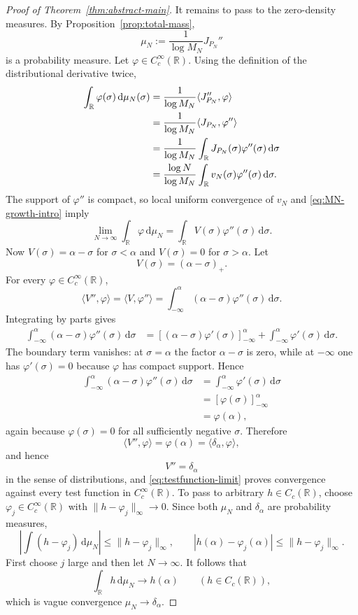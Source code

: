 \documentclass[11pt]{article}
\theoremstyle{definition}
\newcommand{\R}{\mathbb R}
\newcommand{\dd}{\,\mathrm d}
\newcommand{\1}{\mathbf 1}
\begin{document}
\begin{proof}[Proof of Theorem~\ref{thm:abstract-main}]
It remains to pass to the zero-density measures.  By Proposition~\ref{prop:total-mass},
\[
\mu_N:=\frac{1}{\log M_N}J_{P_N}''
\]
is a probability measure.  Let $\varphi\in C_c^\infty(\R)$.  Using the definition of the distributional derivative twice,
\begin{align}
\int_\R\varphi(\sigma)\dd\mu_N(\sigma)
&=\frac1{\log M_N}\langle J_{P_N}'',\varphi\rangle\notag\\
&=\frac1{\log M_N}\langle J_{P_N},\varphi''\rangle\notag\\
&=\frac1{\log M_N}
\int_\R J_{P_N}(\sigma)\varphi''(\sigma)\dd\sigma\notag\\
&=\frac{\log N}{\log M_N}
\int_\R v_N(\sigma)\varphi''(\sigma)\dd\sigma.
\label{eq:testfunction-measure}
\end{align}
The support of $\varphi''$ is compact, so local uniform convergence of $v_N$ and \eqref{eq:MN-growth-intro} imply
\begin{equation}\label{eq:testfunction-limit}
\lim_{N\to\infty}\int_\R\varphi\dd\mu_N
=\int_\R V(\sigma)\varphi''(\sigma)\dd\sigma.
\end{equation}
Now $V(\sigma)=\alpha-\sigma$ for $\sigma<\alpha$ and $V(\sigma)=0$ for $\sigma>\alpha$.  Let
\[
V(\sigma)=(\alpha-\sigma)_+.
\]
For every $\varphi\in C_c^\infty(\R)$,
\[
\langle V'',\varphi\rangle
=
\langle V,\varphi''\rangle
=
\int_{-\infty}^{\alpha}
(\alpha-\sigma)\varphi''(\sigma)\dd\sigma.
\]
Integrating by parts gives
\begin{align*}
\int_{-\infty}^{\alpha}
(\alpha-\sigma)\varphi''(\sigma)\dd\sigma
&=
\left[
(\alpha-\sigma)\varphi'(\sigma)
\right]_{-\infty}^{\alpha}
+
\int_{-\infty}^{\alpha}\varphi'(\sigma)\dd\sigma.
\end{align*}
The boundary term vanishes: at $\sigma=\alpha$ the factor
$\alpha-\sigma$ is zero, while at $-\infty$ one has
$\varphi'(\sigma)=0$ because $\varphi$ has compact support.  Hence
\begin{align*}
\int_{-\infty}^{\alpha}
(\alpha-\sigma)\varphi''(\sigma)\dd\sigma
&=
\int_{-\infty}^{\alpha}\varphi'(\sigma)\dd\sigma\\
&=
\left[\varphi(\sigma)\right]_{-\infty}^{\alpha}\\
&=
\varphi(\alpha),
\end{align*}
again because $\varphi(\sigma)=0$ for all sufficiently negative
$\sigma$.  Therefore
\[
\langle V'',\varphi\rangle=\varphi(\alpha)
=\langle\delta_\alpha,\varphi\rangle,
\]
and hence
\[
V''=\delta_\alpha
\]
in the sense of distributions, and \eqref{eq:testfunction-limit} proves convergence against every test function in $C_c^\infty(\R)$.  To pass to arbitrary $h\in C_c(\R)$, choose $\varphi_j\in C_c^\infty(\R)$ with $\|h-\varphi_j\|_\infty\to0$.  Since both $\mu_N$ and $\delta_\alpha$ are probability measures,
\[
\left|\int(h-\varphi_j)\dd\mu_N\right|
\le\|h-\varphi_j\|_\infty,
\qquad
\left|h(\alpha)-\varphi_j(\alpha)\right|
\le\|h-\varphi_j\|_\infty.
\]
First choose $j$ large and then let $N\to\infty$.  It follows that
\[
\int_\R h\dd\mu_N\longrightarrow h(\alpha)
\qquad(h\in C_c(\R)),
\]
which is vague convergence $\mu_N\to\delta_\alpha$.


\end{proof}
\end{document}
